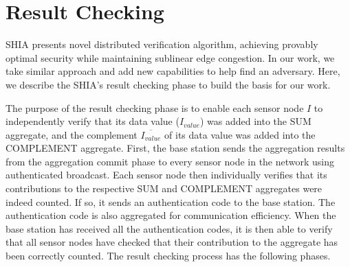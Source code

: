 \section{Result Checking} %
	\label{sec:result_checking}
	SHIA presents novel distributed verification algorithm, achieving provably optimal security while maintaining sublinear edge congestion.
	In our work, we take similar approach and add new capabilities to help find an adversary.
	Here, we describe the SHIA's result checking phase to build the basis for our work.

	The purpose of the result checking phase is to enable each sensor node $I$ to independently verify that its data value ($I_{value}$) was added into the SUM aggregate, and the complement $\overline{I_{value}}$ of its data value was added into the COMPLEMENT aggregate.
	First, the base station sends the aggregation results from the aggregation commit phase to every sensor node in the network using authenticated broadcast.
	Each sensor node then individually verifies that its contributions to the respective SUM and COMPLEMENT aggregates were indeed counted.
	If so, it sends an authentication code to the base station.
	The authentication code is also aggregated for communication efficiency. 
	When the base station has received all the authentication codes, it is then able to verify that all sensor nodes have checked that their contribution to the aggregate has been correctly counted.
	The result checking process has the following phases.

